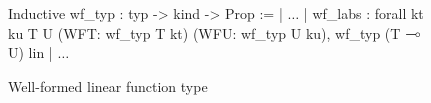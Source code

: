 \begin{figure}
\begin{coq}
Inductive wf_typ : typ -> kind -> Prop :=
  | $\ldots$
  | wf_labs : forall kt ku T U
                     (WFT: wf_typ T kt)
                     (WFU: wf_typ U ku),
                wf_typ (T $\multimap$ U) lin
  | $\ldots$
\end{coq}
\caption{Well-formed linear function type}
\label{fig:wft}
\end{figure}
